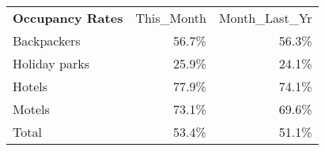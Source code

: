 \begin{tabular}[t]{l{1.5cm}r{1.5cm}r}
 \textbf{Occupancy Rates} & This\_Month & Month\_Last\_Yr \\ 
 Backpackers & 56.7\% & 56.3\% \\ 
  Holiday parks & 25.9\% & 24.1\% \\ 
  Hotels & 77.9\% & 74.1\% \\ 
  Motels & 73.1\% & 69.6\% \\ 
  Total & 53.4\% & 51.1\% \\ 
  \end{tabular}
